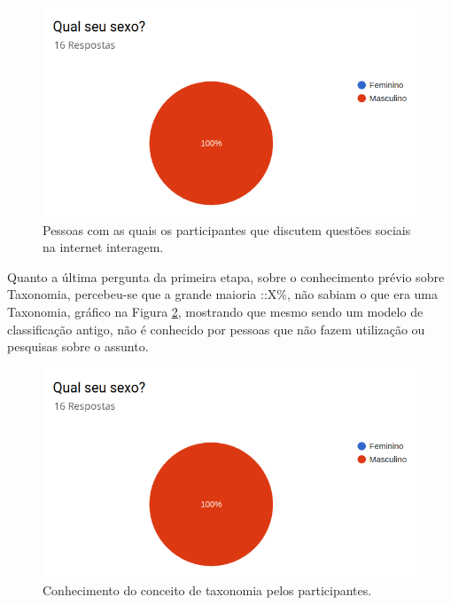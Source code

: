 \begin{figure}[!ht]
    \centering
    \includegraphics[scale=0.3]{./figuras/grafico_placeholder.png}
    \caption{Pessoas com as quais os participantes que discutem questões sociais na internet interagem.}
    \label{fig:grafico-discu-alvo}
\end{figure}

\par
Quanto a última pergunta da primeira etapa, sobre o conhecimento prévio sobre Taxonomia, percebeu-se que a grande maioria ::X\%, não sabiam o que era uma Taxonomia, 
gráfico na Figura  \ref{fig:grafico-conhe-taxonomia}, mostrando que mesmo sendo um modelo de classificação antigo, não é conhecido por pessoas que não fazem utilização ou 
pesquisas sobre o assunto.

\begin{figure}[!ht]
    \centering
    \includegraphics[scale=0.3]{./figuras/grafico_placeholder.png}
    \caption{Conhecimento do conceito de taxonomia pelos participantes.}
    \label{fig:grafico-conhe-taxonomia}
\end{figure}

